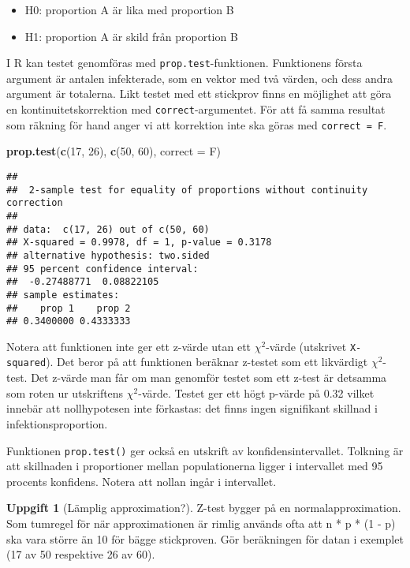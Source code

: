 \documentclass[
]{book}
\newenvironment{Shaded}{\begin{snugshade}}{\end{snugshade}}
\newcommand{\AttributeTok}[1]{\textcolor[rgb]{0.13,0.29,0.53}{#1}}
\newcommand{\DecValTok}[1]{\textcolor[rgb]{0.00,0.00,0.81}{#1}}
\newcommand{\FunctionTok}[1]{\textcolor[rgb]{0.13,0.29,0.53}{\textbf{#1}}}
\newcommand{\NormalTok}[1]{#1}
\providecommand{\tightlist}{%
  \setlength{\itemsep}{0pt}\setlength{\parskip}{0pt}}
\theoremstyle{definition}
\theoremstyle{definition}
\theoremstyle{definition}
\newtheorem{exercise}{Uppgift}[chapter]
\theoremstyle{definition}
\theoremstyle{remark}
\begin{document}
\begin{itemize}
\tightlist
\item
  H0: proportion A är lika med proportion B
\item
  H1: proportion A är skild från proportion B
\end{itemize}

I R kan testet genomföras med \texttt{prop.test}-funktionen. Funktionens första argument är antalen infekterade, som en vektor med två värden, och dess andra argument är totalerna. Likt testet med ett stickprov finns en möjlighet att göra en kontinuitetskorrektion med \texttt{correct}-argumentet. För att få samma resultat som räkning för hand anger vi att korrektion inte ska göras med \texttt{correct\ =\ F}.

\begin{Shaded}
\begin{Highlighting}[]
\FunctionTok{prop.test}\NormalTok{(}\FunctionTok{c}\NormalTok{(}\DecValTok{17}\NormalTok{, }\DecValTok{26}\NormalTok{), }\FunctionTok{c}\NormalTok{(}\DecValTok{50}\NormalTok{, }\DecValTok{60}\NormalTok{), }\AttributeTok{correct =}\NormalTok{ F)}
\end{Highlighting}
\end{Shaded}

\begin{verbatim}
## 
##  2-sample test for equality of proportions without continuity correction
## 
## data:  c(17, 26) out of c(50, 60)
## X-squared = 0.9978, df = 1, p-value = 0.3178
## alternative hypothesis: two.sided
## 95 percent confidence interval:
##  -0.27488771  0.08822105
## sample estimates:
##    prop 1    prop 2 
## 0.3400000 0.4333333
\end{verbatim}

Notera att funktionen inte ger ett z-värde utan ett \(\chi^2\)-värde (utskrivet \texttt{X-squared}). Det beror på att funktionen beräknar z-testet som ett likvärdigt \(\chi^2\)-test. Det z-värde man får om man genomför testet som ett z-test är detsamma som roten ur utskriftens \(\chi^2\)-värde. Testet ger ett högt p-värde på 0.32 vilket innebär att nollhypotesen inte förkastas: det finns ingen signifikant skillnad i infektionsproportion.

Funktionen \texttt{prop.test()} ger också en utskrift av konfidensintervallet. Tolkning är att skillnaden i proportioner mellan populationerna ligger i intervallet med 95 procents konfidens. Notera att nollan ingår i intervallet.

\begin{exercise}[Lämplig approximation?]
Z-test bygger på en normalapproximation. Som tumregel för när approximationen är rimlig används ofta att n * p * (1 - p) ska vara större än 10 för bägge stickproven. Gör beräkningen för datan i exemplet (17 av 50 respektive 26 av 60).
\end{exercise}
\end{document}
